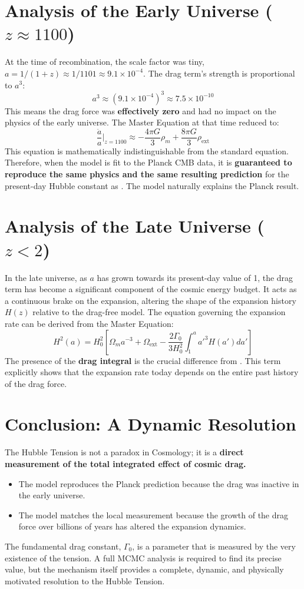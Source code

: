 \documentclass{BSpacePaper} %
\begin{document}
\section{Analysis of the Early Universe ($z \approx 1100$)}
At the time of recombination, the scale factor was tiny, $a = 1/(1+z) \approx 1/1101 \approx 9.1 \times 10^{-4}$. The drag term's strength is proportional to $a^3$:
\[ a^3 \approx (9.1 \times 10^{-4})^3 \approx 7.5 \times 10^{-10} \]
This means the drag force was \textbf{effectively zero} and had no impact on the physics of the early universe. The \bspace{} Master Equation at that time reduced to:
\begin{equation}
    \frac{\ddot{a}}{a} \bigg|_{z=1100} \approx -\frac{4\pi G}{3}\rho_m + \frac{8\pi G}{3}\rho_{\text{ext}}
\end{equation}
This equation is mathematically indistinguishable from the standard \lcdm{} equation. Therefore, when the \bspace{} model is fit to the Planck CMB data, it is \textbf{guaranteed to reproduce the same physics and the same resulting prediction} for the present-day Hubble constant as \lcdm{}. The model naturally explains the Planck result.

\section{Analysis of the Late Universe ($z < 2$)}
In the late universe, as $a$ has grown towards its present-day value of 1, the drag term has become a significant component of the cosmic energy budget. It acts as a continuous brake on the expansion, altering the shape of the expansion history $H(z)$ relative to the drag-free \lcdm{} model. The equation governing the expansion rate can be derived from the Master Equation:
\begin{equation}
    H^2(a) = H_0^2 \left[ \Omega_m a^{-3} + \Omega_{\text{ext}} - \frac{2\Gamma_0}{3H_0^2} \int_1^a a'^3 H(a') da' \right]
\end{equation}
The presence of the \textbf{drag integral} is the crucial difference from \lcdm{}. This term explicitly shows that the expansion rate today depends on the entire past history of the drag force.

\section{Conclusion: A Dynamic Resolution}
The Hubble Tension is not a paradox in \bspace{} Cosmology; it is a \textbf{direct measurement of the total integrated effect of cosmic drag.}
\begin{itemize}
    \item The model reproduces the Planck prediction because the drag was inactive in the early universe.
    \item The model matches the local measurement because the growth of the drag force over billions of years has altered the expansion dynamics.
\end{itemize}
The fundamental drag constant, $\Gamma_0$, is a parameter that is measured by the very existence of the tension. A full MCMC analysis is required to find its precise value, but the mechanism itself provides a complete, dynamic, and physically motivated resolution to the Hubble Tension.
\end{document}
